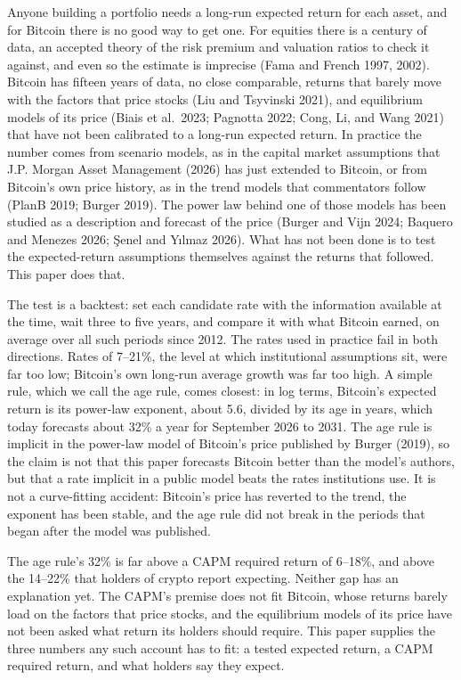 \documentclass[12pt]{article}
\theoremstyle{plain}
\theoremstyle{remark}
\begin{document}
Anyone building a portfolio needs a long-run expected return for each asset, and for Bitcoin there is no good way to get one. For equities there is a century of data, an accepted theory of the risk premium and valuation ratios to check it against, and even so the estimate is imprecise (Fama and French 1997, 2002). Bitcoin has fifteen years of data, no close comparable, returns that barely move with the factors that price stocks (Liu and Tsyvinski 2021), and equilibrium models of its price (Biais et al.\ 2023; Pagnotta 2022; Cong, Li, and Wang 2021) that have not been calibrated to a long-run expected return. In practice the number comes from scenario models, as in the capital market assumptions that J.P. Morgan Asset Management (2026) has just extended to Bitcoin, or from Bitcoin's own price history, as in the trend models that commentators follow (PlanB 2019; Burger 2019). The power law behind one of those models has been studied as a description and forecast of the price (Burger and Vijn 2024; Baquero and Menezes 2026; \c{S}enel and Y{\i}lmaz 2026). What has not been done is to test the expected-return assumptions themselves against the returns that followed. This paper does that.

The test is a backtest: set each candidate rate with the information available at the time, wait three to five years, and compare it with what Bitcoin earned, on average over all such periods since 2012. The rates used in practice fail in both directions. Rates of 7--21\%, the level at which institutional assumptions sit, were far too low; Bitcoin's own long-run average growth was far too high. A simple rule, which we call the age rule, comes closest: in log terms, Bitcoin's expected return is its power-law exponent, about 5.6, divided by its age in years, which today forecasts about 32\% a year for September 2026 to 2031. The age rule is implicit in the power-law model of Bitcoin's price published by Burger (2019), so the claim is not that this paper forecasts Bitcoin better than the model's authors, but that a rate implicit in a public model beats the rates institutions use. It is not a curve-fitting accident: Bitcoin's price has reverted to the trend, the exponent has been stable, and the age rule did not break in the periods that began after the model was published.

The age rule's 32\% is far above a CAPM required return of 6--18\%, and above the 14--22\% that holders of crypto report expecting. Neither gap has an explanation yet. The CAPM's premise does not fit Bitcoin, whose returns barely load on the factors that price stocks, and the equilibrium models of its price have not been asked what return its holders should require. This paper supplies the three numbers any such account has to fit: a tested expected return, a CAPM required return, and what holders say they expect.
\end{document}
